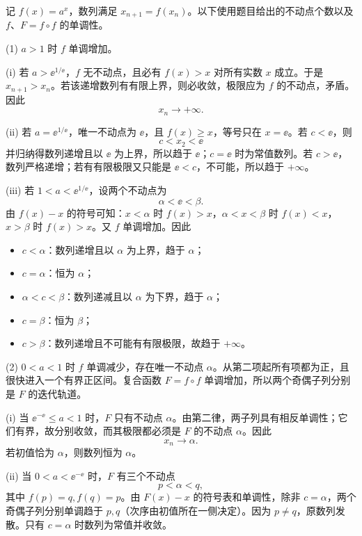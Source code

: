 \begin{xsolution}
记 $f(x)=a^x$，数列满足 $x_{n+1}=f(x_n)$。以下使用题目给出的不动点个数以及 $f$、$F=f\circ f$ 的单调性。

(1) $a>1$ 时 $f$ 单调增加。

(i) 若 $a>\ee^{1/\ee}$，$f$ 无不动点，且必有 $f(x)>x$ 对所有实数 $x$ 成立。于是 $x_{n+1}>x_n$。若该递增数列有有限上界，则必收敛，极限应为 $f$ 的不动点，矛盾。因此
\[
  x_n\to+\infty.
\]

(ii) 若 $a=\ee^{1/\ee}$，唯一不动点为 $\ee$，且 $f(x)\ge x$，等号只在 $x=\ee$。若 $c<\ee$，则
\[
  c<x_2<\ee
\]
并归纳得数列递增且以 $\ee$ 为上界，所以趋于 $\ee$；$c=\ee$ 时为常值数列。若 $c>\ee$，数列严格递增；若有有限极限又只能是 $\ee<c$，不可能，所以趋于 $+\infty$。

(iii) 若 $1<a<\ee^{1/\ee}$，设两个不动点为
\[
  \alpha<\ee<\beta.
\]
由 $f(x)-x$ 的符号可知：$x<\alpha$ 时 $f(x)>x$，$\alpha<x<\beta$ 时 $f(x)<x$，$x>\beta$ 时 $f(x)>x$。又 $f$ 单调增加。因此
\begin{itemize}
  \item $c<\alpha$：数列递增且以 $\alpha$ 为上界，趋于 $\alpha$；
  \item $c=\alpha$：恒为 $\alpha$；
  \item $\alpha<c<\beta$：数列递减且以 $\alpha$ 为下界，趋于 $\alpha$；
  \item $c=\beta$：恒为 $\beta$；
  \item $c>\beta$：数列递增且不可能有有限极限，故趋于 $+\infty$。
\end{itemize}

(2) $0<a<1$ 时 $f$ 单调减少，存在唯一不动点 $\alpha$。从第二项起所有项都为正，且很快进入一个有界正区间。复合函数 $F=f\circ f$ 单调增加，所以两个奇偶子列分别是 $F$ 的迭代轨道。

(i) 当 $\ee^{-\ee}\le a<1$ 时，$F$ 只有不动点 $\alpha$。由第二律，两子列具有相反单调性；它们有界，故分别收敛，而其极限都必须是 $F$ 的不动点 $\alpha$。因此
\[
  \boxed{x_n\to\alpha}.
\]
若初值恰为 $\alpha$，则数列恒为 $\alpha$。

(ii) 当 $0<a<\ee^{-\ee}$ 时，$F$ 有三个不动点
\[
  p<\alpha<q,
\]
其中 $f(p)=q,f(q)=p$。由 $F(x)-x$ 的符号表和单调性，除非 $c=\alpha$，两个奇偶子列分别单调趋于 $p,q$（次序由初值所在一侧决定）。因为 $p\ne q$，原数列发散。只有 $c=\alpha$ 时数列为常值并收敛。
\end{xsolution}


